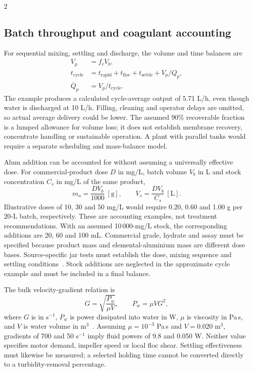 \documentclass{ieeeaccess}
\begin{document}
\begin{multicols}{2}
\subsection{Batch throughput and coagulant accounting}
For sequential mixing, settling and discharge, the volume and time balances are
\begin{equation}
\begin{split}
V_p&=f_r V_b,\\
t_{\mathrm{cycle}}&=t_{\mathrm{rapid}}+t_{\mathrm{floc}}+t_{\mathrm{settle}}+V_p/Q_p,\\
\overline{Q}_p&=V_p/t_{\mathrm{cycle}}.
\end{split}
\label{eq:cycle}
\end{equation}
The example produces a calculated cycle-average output of 5.71 L/h, even though water is discharged at 10 L/h. Filling, cleaning and operator delays are omitted, so actual average delivery could be lower. The assumed 90\% recoverable fraction is a lumped allowance for volume loss; it does not establish membrane recovery, concentrate handling or sustainable operation. A plant with parallel tanks would require a separate scheduling and mass-balance model.

Alum addition can be accounted for without assuming a universally effective dose. For commercial-product dose $D$ in mg/L, batch volume $V_b$ in L and stock concentration $C_s$ in mg/L of the same product,
\begin{equation}
m_a=\frac{D V_b}{1000}\ [\mathrm{g}],\qquad
V_s=\frac{D V_b}{C_s}\ [\mathrm{L}].
\label{eq:alum}
\end{equation}
Illustrative doses of 10, 30 and 50 mg/L would require 0.20, 0.60 and 1.00 g per 20-L batch, respectively. These are accounting examples, not treatment recommendations. With an assumed 10\,000-mg/L stock, the corresponding additions are 20, 60 and 100 mL. Commercial grade, hydrate and assay must be specified because product mass and elemental-aluminium mass are different dose bases. Source-specific jar tests must establish the dose, mixing sequence and settling conditions~\cite{epa_turbidity2004}. Stock additions are neglected in the approximate cycle example and must be included in a final balance.

The bulk velocity-gradient relation is
\begin{equation}
G=\sqrt{\frac{P_w}{\mu V}},\qquad P_w=\mu V G^2,
\label{eq:mixing}
\end{equation}
where $G$ is in s$^{-1}$, $P_w$ is power dissipated into water in W, $\mu$ is viscosity in Pa\,s, and $V$ is water volume in m$^3$~\cite{epa_nutrient2010}. Assuming $\mu=10^{-3}$ Pa\,s and $V=0.020$ m$^3$, gradients of 700 and 50 s$^{-1}$ imply fluid powers of 9.8 and 0.050 W. Neither value specifies motor demand, impeller speed or local floc shear. Settling effectiveness must likewise be measured; a selected holding time cannot be converted directly to a turbidity-removal percentage.


\end{multicols}
\end{document}
